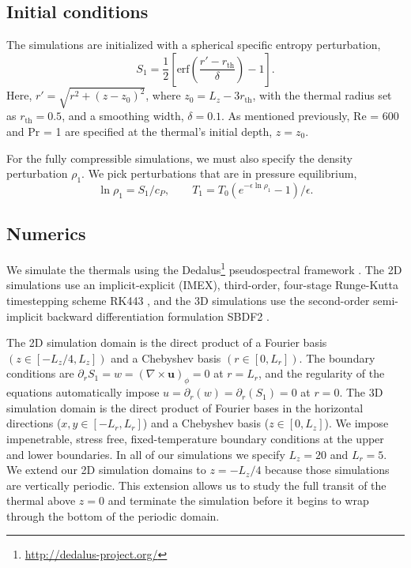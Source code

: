 \documentclass[twocolumn, amsmath, amsfonts, amssymb, trackchanges]{aastex62}
\newcommand{\grad}{\ensuremath{\nabla}}
\begin{document}
\subsection{Initial conditions}
The simulations are initialized with a spherical specific entropy perturbation,
\begin{equation}
S_1 = \frac{1}{2}\left[\text{erf}\left(\frac{r' - r_{\text{th}}}{\delta}\right) - 1\right].
\label{eqn:thermal_IC}
\end{equation}
Here, $r' = \sqrt{r^2 + (z - z_0)^2}$, where $z_0 = L_z - 3r_{\text{th}}$, with the thermal radius set as $r_{\text{th}} = 0.5$, and a smoothing width, $\delta = 0.1$.
As mentioned previously, Re = 600 and Pr = 1 are specified at the thermal's initial depth, $z = z_0$.

For the fully compressible simulations, we must also specify the density perturbation $\rho_1$.
We pick perturbations that are in pressure equilibrium,
\begin{equation}
\ln\rho_1 = S_1/c_P, \qquad T_1 = T_0(e^{-\epsilon\ln\rho_1} - 1)/\epsilon.
\end{equation}


\subsection{Numerics}
We simulate the thermals using the  Dedalus\footnote{\url{http://dedalus-project.org/}} pseudospectral framework \citep{burns&all2016, burns&all2019}.
The 2D simulations use an implicit-explicit (IMEX), third-order, four-stage Runge-Kutta timestepping scheme RK443 \citep{ascher&all1997}, and the 3D simulations use the second-order semi-implicit backward differentiation formulation SBDF2 \citep{wang&ruuth2008}.

The 2D simulation domain is the direct product of a Fourier basis $(z \in [-L_z/4, L_z])$ and a Chebyshev basis $(r \in [0, L_r])$.
The boundary conditions are $\partial_r S_1 = w = (\grad\times\bm{u})_\phi = 0$ at $r = L_r$, and the regularity of the equations automatically impose $u = \partial_r(w) = \partial_r(S_1) = 0$ at $r = 0$.
The 3D simulation domain is the direct product of Fourier bases in the horizontal directions ($x, y \in [-L_r, L_r]$) and a Chebyshev basis ($z \in [0, L_z]$).
We impose impenetrable, stress free, fixed-temperature boundary conditions at the upper and lower boundaries.
In all of our simulations we specify $L_z = 20$ and $L_r = 5$.
We extend our 2D simulation domains to $z = -L_z/4$ because those simulations are vertically periodic.
This extension allows us to study the full transit of the thermal above $z = 0$ and terminate the simulation before it begins to wrap through the bottom of the periodic domain.
\end{document}
